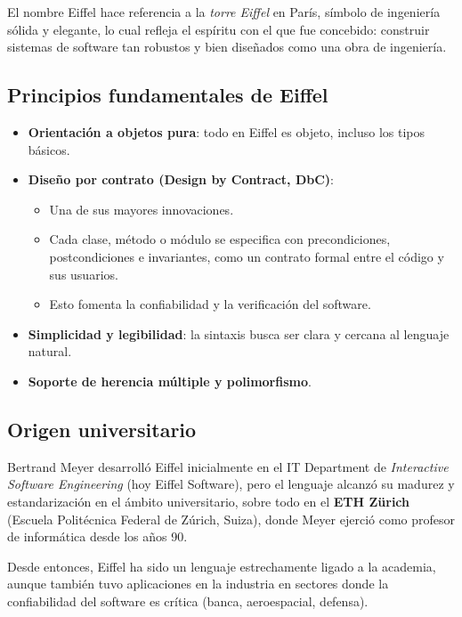 \documentclass[a4paper,12pt]{article}
\begin{document}
\noindent
El nombre Eiffel hace referencia a la \textit{torre Eiffel} en París, símbolo
de ingeniería sólida y elegante, lo cual refleja el espíritu con el que fue
concebido: construir sistemas de software tan robustos y bien diseñados como
una obra de ingeniería.

\subsection{Principios fundamentales de Eiffel}

\begin{itemize}
    \item \textbf{Orientación a objetos pura}: todo en Eiffel es objeto,
          incluso los tipos básicos.
    \item \textbf{Diseño por contrato (Design by Contract, DbC)}:
          \begin{itemize}
              \item Una de sus mayores innovaciones.
              \item Cada clase, método o módulo se especifica con
                    precondiciones,
                    postcondiciones e invariantes, como un contrato formal
                    entre el código y sus
                    usuarios.
              \item Esto fomenta la confiabilidad y la verificación del
                    software.
          \end{itemize}
    \item \textbf{Simplicidad y legibilidad}: la sintaxis busca ser clara y
          cercana al lenguaje natural.
    \item \textbf{Soporte de herencia múltiple y polimorfismo}.
\end{itemize}

\subsection{Origen universitario}

Bertrand Meyer desarrolló Eiffel inicialmente en el IT Department de
\textit{Interactive Software Engineering} (hoy Eiffel Software), pero el
lenguaje alcanzó su madurez y estandarización en el ámbito universitario, sobre
todo en el \textbf{ETH Zürich} (Escuela Politécnica Federal de Zúrich, Suiza),
donde Meyer ejerció como profesor de informática desde los años 90.

\noindent
Desde entonces, Eiffel ha sido un lenguaje estrechamente ligado a la academia,
aunque también tuvo aplicaciones en la industria en sectores donde la
confiabilidad del software es crítica (banca, aeroespacial, defensa).
\end{document}
